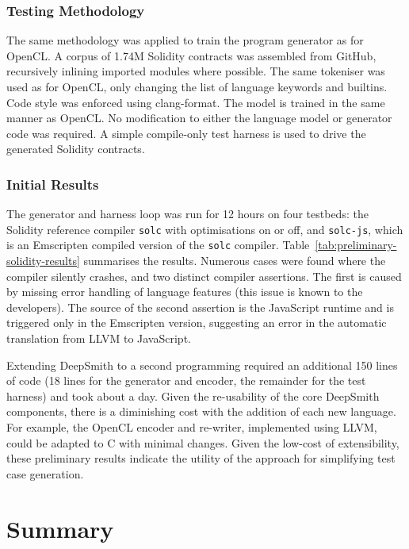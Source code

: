 \subsubsection{Testing Methodology}

The same methodology was applied to train the program generator as for OpenCL. A corpus of 1.74M Solidity contracts was assembled from GitHub, recursively inlining imported modules where possible. The same tokeniser was used as for OpenCL, only changing the list of language keywords and builtins. Code style was enforced using clang-format. The model is trained in the same manner as OpenCL. No modification to either the language model or generator code was required. A simple compile-only test harness is used to drive the generated Solidity contracts.


\subsubsection{Initial Results}

The generator and harness loop was run for 12 hours on four testbeds: the Solidity reference compiler \texttt{solc} with optimisations on or off, and \texttt{solc-js}, which is an Emscripten compiled version of the \texttt{solc} compiler. Table~\ref{tab:preliminary-solidity-results} summarises the results. Numerous cases were found where the compiler silently crashes, and two distinct compiler assertions. The first is caused by missing error handling of language features (this issue is known to the developers). The source of the second assertion is the JavaScript runtime and is triggered only in the Emscripten version, suggesting an error in the automatic translation from LLVM to JavaScript.

Extending DeepSmith to a second programming required an additional 150 lines of code (18 lines for the generator and encoder, the remainder for the test harness) and took about a day. Given the re-usability of the core DeepSmith components, there is a diminishing cost with the addition of each new language. For example, the OpenCL encoder and re-writer, implemented using LLVM, could be adapted to C with minimal changes. Given the low-cost of extensibility, these preliminary results indicate the utility of the approach for simplifying test case generation.


\section{Summary}
\label{sec:deepsmith-conclusion}

